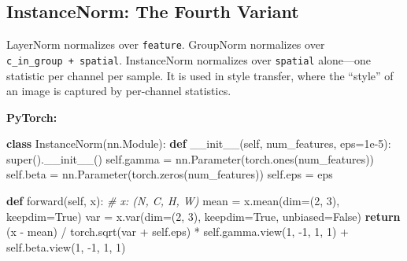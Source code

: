 \documentclass[11pt,titlepage]{article}
\newenvironment{Shaded}{}{}
\newcommand{\BuiltInTok}[1]{#1}
\newcommand{\CommentTok}[1]{\textcolor[rgb]{0.38,0.63,0.69}{\textit{#1}}}
\newcommand{\ControlFlowTok}[1]{\textcolor[rgb]{0.00,0.44,0.13}{\textbf{#1}}}
\newcommand{\DecValTok}[1]{\textcolor[rgb]{0.25,0.63,0.44}{#1}}
\newcommand{\FloatTok}[1]{\textcolor[rgb]{0.25,0.63,0.44}{#1}}
\newcommand{\FunctionTok}[1]{\textcolor[rgb]{0.02,0.16,0.49}{#1}}
\newcommand{\KeywordTok}[1]{\textcolor[rgb]{0.00,0.44,0.13}{\textbf{#1}}}
\newcommand{\NormalTok}[1]{#1}
\newcommand{\OperatorTok}[1]{\textcolor[rgb]{0.40,0.40,0.40}{#1}}
\newcommand{\VariableTok}[1]{\textcolor[rgb]{0.10,0.09,0.49}{#1}}
\begin{document}
\vspace{2em}

\hypertarget{instancenorm-the-fourth-variant}{%
\subsection{InstanceNorm: The Fourth
Variant}\label{instancenorm-the-fourth-variant}}

LayerNorm normalizes over \texttt{feature}. GroupNorm normalizes over
\texttt{c\_in\_group\ +\ spatial}. InstanceNorm normalizes over
\texttt{spatial} alone---one statistic per channel per sample. It is
used in style transfer, where the ``style'' of an image is captured by
per-channel statistics.

\textbf{PyTorch:}

\begin{Shaded}
\begin{Highlighting}[]
\KeywordTok{class}\NormalTok{ InstanceNorm(nn.Module):}
    \KeywordTok{def} \FunctionTok{__init__}\NormalTok{(}\VariableTok{self}\NormalTok{, num_features, eps}\OperatorTok{=}\FloatTok{1e-5}\NormalTok{):}
        \BuiltInTok{super}\NormalTok{().}\FunctionTok{__init__}\NormalTok{()}
        \VariableTok{self}\NormalTok{.gamma }\OperatorTok{=}\NormalTok{ nn.Parameter(torch.ones(num_features))}
        \VariableTok{self}\NormalTok{.beta }\OperatorTok{=}\NormalTok{ nn.Parameter(torch.zeros(num_features))}
        \VariableTok{self}\NormalTok{.eps }\OperatorTok{=}\NormalTok{ eps}

    \KeywordTok{def}\NormalTok{ forward(}\VariableTok{self}\NormalTok{, x):}
        \CommentTok{# x: (N, C, H, W)}
\NormalTok{        mean }\OperatorTok{=}\NormalTok{ x.mean(dim}\OperatorTok{=}\NormalTok{(}\DecValTok{2}\NormalTok{, }\DecValTok{3}\NormalTok{), keepdim}\OperatorTok{=}\VariableTok{True}\NormalTok{)}
\NormalTok{        var }\OperatorTok{=}\NormalTok{ x.var(dim}\OperatorTok{=}\NormalTok{(}\DecValTok{2}\NormalTok{, }\DecValTok{3}\NormalTok{), keepdim}\OperatorTok{=}\VariableTok{True}\NormalTok{, unbiased}\OperatorTok{=}\VariableTok{False}\NormalTok{)}
        \ControlFlowTok{return}\NormalTok{ (x }\OperatorTok{-}\NormalTok{ mean) }\OperatorTok{/}\NormalTok{ torch.sqrt(var }\OperatorTok{+} \VariableTok{self}\NormalTok{.eps) }\OperatorTok{*} \VariableTok{self}\NormalTok{.gamma.view(}\DecValTok{1}\NormalTok{, }\DecValTok{-1}\NormalTok{, }\DecValTok{1}\NormalTok{, }\DecValTok{1}\NormalTok{) }\OperatorTok{+} \VariableTok{self}\NormalTok{.beta.view(}\DecValTok{1}\NormalTok{, }\DecValTok{-1}\NormalTok{, }\DecValTok{1}\NormalTok{, }\DecValTok{1}\NormalTok{)}
\end{Highlighting}
\end{Shaded}
\end{document}

